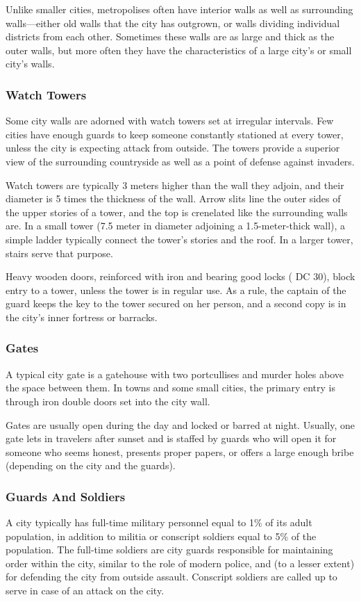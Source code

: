 Unlike smaller cities, metropolises often have interior walls as well as surrounding walls---either old walls that the city has outgrown, or walls dividing individual districts from each other. Sometimes these walls are as large and thick as the outer walls, but more often they have the characteristics of a large city's or small city's walls.

\subsubsection{Watch Towers}
Some city walls are adorned with watch towers set at irregular intervals. Few cities have enough guards to keep someone constantly stationed at every tower, unless the city is expecting attack from outside. The towers provide a superior view of the surrounding countryside as well as a point of defense against invaders.

Watch towers are typically 3 meters higher than the wall they adjoin, and their diameter is 5 times the thickness of the wall. Arrow slits line the outer sides of the upper stories of a tower, and the top is crenelated like the surrounding walls are. In a small tower (7.5 meter in diameter adjoining a 1.5-meter-thick wall), a simple ladder typically connect the tower's stories and the roof. In a larger tower, stairs serve that purpose.

Heavy wooden doors, reinforced with iron and bearing good locks ( DC 30), block entry to a tower, unless the tower is in regular use. As a rule, the captain of the guard keeps the key to the tower secured on her person, and a second copy is in the city's inner fortress or barracks.

\subsubsection{Gates}
A typical city gate is a gatehouse with two portcullises and murder holes above the space between them. In towns and some small cities, the primary entry is through iron double doors set into the city wall.

Gates are usually open during the day and locked or barred at night. Usually, one gate lets in travelers after sunset and is staffed by guards who will open it for someone who seems honest, presents proper papers, or offers a large enough bribe (depending on the city and the guards).

\subsubsection{Guards And Soldiers}
A city typically has full-time military personnel equal to 1\% of its adult population, in addition to militia or conscript soldiers equal to 5\% of the population. The full-time soldiers are city guards responsible for maintaining order within the city, similar to the role of modern police, and (to a lesser extent) for defending the city from outside assault. Conscript soldiers are called up to serve in case of an attack on the city.

